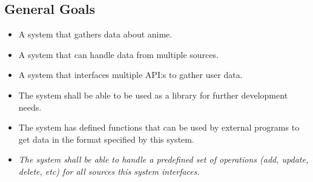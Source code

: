 \subsection{General Goals}
\begin{itemize}
    \item A system that gathers data about anime.
    \item A system that can handle data from multiple sources.
    \item A system that interfaces multiple API:s to gather user data.
    \item The system shall be able to be used as a library for further development needs.
    \item The system has defined functions that can be used by external programs to get data in the format specified by this system.
    \item \textit{The system shall be able to handle a predefined set of operations (add, update, delete, etc) for all sources this system interfaces.}
\end{itemize}
